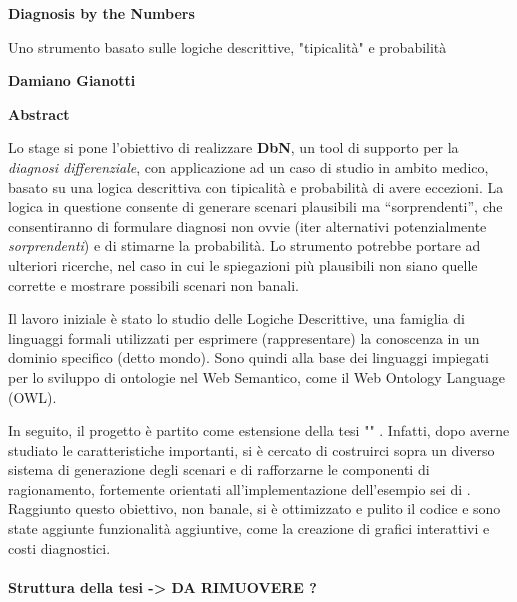 

\thispagestyle{plain}
\begin{center}
	\Large
	\textbf{Diagnosis by the Numbers}
	
	\vspace{0.4cm}
	\large
	Uno strumento basato sulle logiche descrittive, "tipicalità" e probabilità
	
	\vspace{0.4cm}
	\textbf{Damiano Gianotti}
	
	\vspace{0.9cm}
	\textbf{Abstract}
\end{center}

Lo stage si pone l’obiettivo di realizzare \textbf{DbN}, un tool di supporto per la \textit{diagnosi differenziale}, 
con applicazione ad un caso di studio in ambito medico, basato su una logica descrittiva con tipicalità e probabilità di avere eccezioni.
La logica in questione consente di generare scenari plausibili ma “sorprendenti”, che consentiranno di formulare
diagnosi non ovvie  (iter alternativi potenzialmente \textit{sorprendenti}) e di stimarne la probabilità. 
Lo strumento potrebbe portare ad ulteriori ricerche, nel caso in cui le spiegazioni
più plausibili non siano quelle corrette e mostrare possibili scenari non banali.
 
Il lavoro iniziale è stato lo studio delle Logiche Descrittive, una famiglia 
di linguaggi formali utilizzati per esprimere (rappresentare) la conoscenza 
in un dominio specifico (detto mondo). Sono quindi alla base dei linguaggi impiegati per lo sviluppo
di ontologie nel Web Semantico, come il Web Ontology Language (OWL).

In seguito, il progetto è partito come estensione della tesi "" \cite{PEAR}. Infatti, dopo averne studiato le caratteristiche importanti, si è cercato di costruirci sopra un diverso sistema di generazione degli scenari e di rafforzarne le componenti di ragionamento, fortemente orientati all'implementazione dell'esempio sei di  \cite{ProbOfEx}.
Raggiunto questo obiettivo, non banale, si è ottimizzato e pulito il codice
e sono state aggiunte funzionalità aggiuntive, come la creazione di grafici interattivi e costi
diagnostici.


\paragraph{Struttura della tesi -> DA RIMUOVERE ?}

